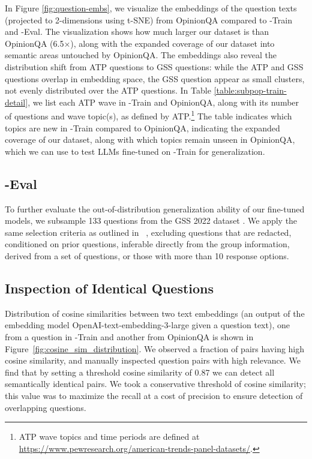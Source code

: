 In Figure \ref{fig:question-embs}, we visualize the embeddings of the question texts (projected to 2-dimensions using t-SNE) from OpinionQA compared to \OURDATA-Train and \OURDATA-Eval.
The visualization shows how much larger our dataset is than OpinionQA (6.5$\times$), along with the expanded coverage of our dataset into semantic areas untouched by OpinionQA. 
The embeddings also reveal the distribution shift from ATP questions to GSS questions: while the ATP and GSS questions overlap in embedding space, the GSS question appear as small clusters, not evenly distributed over the ATP questions. 
In Table \ref{table:subpop-train-detail}, we list each ATP wave in \OURDATA-Train and OpinionQA, along with its number of questions and wave topic(s), as defined by ATP.\footnote{ATP wave topics and time periods are defined at \url{https://www.pewresearch.org/american-trends-panel-datasets/}.} 
The table indicates which topics are new in \OURDATA-Train compared to OpinionQA, indicating the expanded coverage of our dataset, along with which topics remain unseen in OpinionQA, which we can use to test LLMs fine-tuned on \OURDATA-Train for generalization.

\subsection{\OURDATA-Eval}
\label{appendix_outdata_gss}
To further evaluate the out-of-distribution generalization ability of our fine-tuned models, we subsample 133 questions from the GSS 2022 dataset \cite{davern2024gss}.
We apply the same selection criteria as outlined in ~, excluding questions that are redacted, conditioned on prior questions, inferable directly from the group information, derived from a set of questions, or those with more than 10 response options.

\subsection{Inspection of Identical Questions}
Distribution of cosine similarities between two text embeddings (an output of the embedding model OpenAI-text-embedding-3-large given a question text), one from a question in \OURDATA-Train and another from OpinionQA is shown in Figure~\ref{fig:cosine_sim_distribution}.
We observed a fraction of pairs having high cosine similarity,
and manually inspected question pairs with high relevance. We find that by setting a threshold cosine similarity of 0.87 we can detect all semantically identical pairs.
We took a conservative threshold of cosine similarity; this value was to maximize the recall at a cost of precision to ensure detection of overlapping questions.


